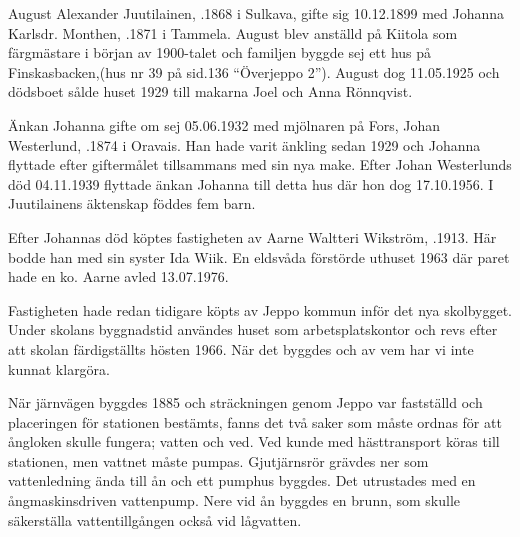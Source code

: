 


August Alexander Juutilainen, .1868 i Sulkava, gifte sig 10.12.1899 med Johanna Karlsdr. Monthen, .1871 i Tammela. August blev anställd på Kiitola som färgmästare i början av 1900-talet och familjen byggde sej ett hus på Finskasbacken,(hus nr 39 på sid.136 ``Överjeppo 2''). August dog 11.05.1925 och dödsboet sålde huset 1929 till makarna Joel och Anna Rönnqvist.

Änkan Johanna gifte om sej 05.06.1932 med mjölnaren på Fors, Johan Westerlund, .1874 i Oravais. Han hade varit änkling sedan 1929 och Johanna flyttade efter giftermålet tillsammans med sin nya make. Efter Johan Westerlunds död 04.11.1939 flyttade änkan Johanna till detta hus där hon dog 17.10.1956. I Juutilainens äktenskap föddes fem barn.
\begin{jhchildren}
  \item {}
  \item {}
  \item {}
  \item {}
  \item {}
\end{jhchildren}
Efter Johannas död köptes fastigheten av Aarne Waltteri Wikström, .1913. Här bodde han med sin syster Ida Wiik. En eldsvåda förstörde uthuset 1963 där paret hade en ko. Aarne avled 13.07.1976.

Fastigheten hade redan tidigare köpts av Jeppo kommun inför det nya skolbygget. Under skolans byggnadstid användes huset som arbetsplatskontor och revs efter att skolan färdigställts hösten 1966. När det byggdes och av vem har vi inte kunnat klargöra.





När järnvägen byggdes 1885 och sträckningen genom Jeppo var fastställd och placeringen för stationen bestämts, fanns det två saker som måste ordnas för att ångloken skulle fungera; vatten och ved. Ved kunde med hästtransport köras till stationen, men vattnet måste pumpas. Gjutjärnsrör grävdes ner som vattenledning ända till ån och ett pumphus byggdes. Det utrustades med en ångmaskinsdriven vattenpump. Nere vid ån byggdes en brunn, som skulle säkerställa vattentillgången också vid lågvatten.

